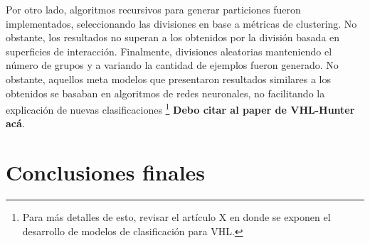 Por otro lado, algoritmos recursivos para generar particiones fueron implementados, seleccionando las divisiones en base a métricas de clustering. No obstante, los resultados no superan a los obtenidos por la división basada en superficies de interacción. Finalmente, divisiones aleatorias manteniendo el número de grupos y a variando la cantidad de ejemplos fueron generado. No obstante, aquellos meta modelos que presentaron resultados similares a los obtenidos se basaban en algoritmos de redes neuronales, no facilitando la explicación de nuevas clasificaciones \footnote{Para más detalles de esto, revisar el artículo X en donde se exponen el desarrollo de modelos de clasificación para VHL.} \textbf{Debo citar al paper de VHL-Hunter acá}.


\section{Conclusiones finales}



